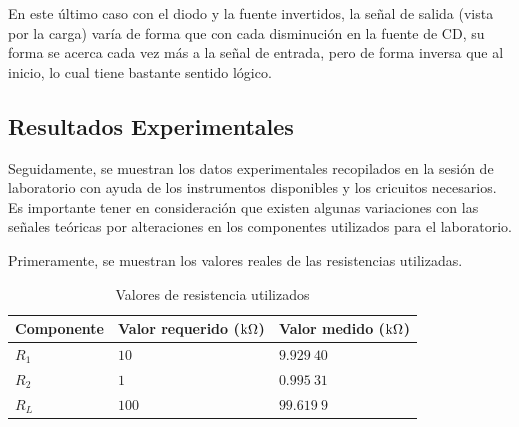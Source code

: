 \documentclass[journal]{IEEEtran}
\begin{document}
En este último caso con el diodo y la fuente invertidos, la señal de salida (vista por la carga) varía de forma que con cada disminución en la fuente de CD, su forma 
se acerca cada vez más a la señal de entrada, pero de forma inversa que al inicio, lo cual tiene bastante sentido lógico. 


\subsection{Resultados Experimentales}

Seguidamente, se muestran los datos experimentales recopilados en la sesión de laboratorio con ayuda de los instrumentos disponibles y los cricuitos necesarios.
Es importante tener en consideración que existen algunas variaciones con las señales teóricas por alteraciones en los componentes utilizados para el laboratorio.

Primeramente, se muestran los valores reales de las resistencias utilizadas. 

\begin{table}[H]
        \centering
        \renewcommand{\arraystretch}{1.5}
        \caption{Valores de resistencia utilizados}
        \begin{tabular}{ m{2cm} m{2cm} m{2cm} }
            \hline
            Componente & Valor requerido ($\textnormal{k}\Omega$) & Valor medido ($\textnormal{k}\Omega$) \\ 
            \hline
            $R_1$ & $10$ & $9.929~40$ \\ 
            $R_2$ & $1$ & $0.995~31$ \\
            $R_L$ & $100$ & $99.619~9$ \\
            \hline
        \end{tabular}
        \label{tabla1}
    \end{table}
    
\end{document}
